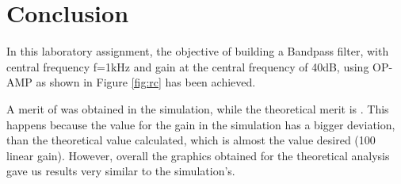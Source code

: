\section{Conclusion}
\label{sec:conclusion}
In this laboratory assignment, the objective of building a Bandpass filter, with central frequency f=1kHz and gain at the central frequency of 40dB, using OP-AMP as shown in Figure \ref{fig:rc} has been achieved.

A merit of  was obtained in the simulation, while the theoretical merit is . This happens because the value for the gain  in the simulation has a bigger deviation, than the theoretical value calculated, which is almost the value desired (100 linear gain). However, overall the graphics obtained for the theoretical analysis gave us results very similar to the simulation's.








